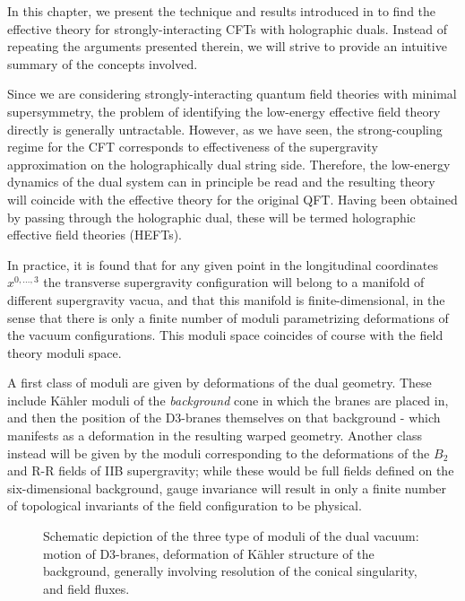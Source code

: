 In this chapter, we present the technique and results introduced in \cite{MZ} to find the effective theory for strongly-interacting CFTs with holographic duals. Instead of repeating the arguments presented therein, we will strive to provide an intuitive summary of the concepts involved.

Since we are considering strongly-interacting quantum field theories with minimal supersymmetry, the problem of identifying the low-energy effective field theory directly is generally untractable. However, as we have seen, the strong-coupling regime for the CFT corresponds to effectiveness of the supergravity approximation on the holographically dual string side. Therefore, the low-energy dynamics of the dual system can in principle be read and the resulting theory will coincide with the effective theory for the original QFT. Having been obtained by passing through the holographic dual, these will be termed holographic effective field theories (HEFTs).

In practice, it is found that for any given point in the longitudinal coordinates $x^{0,\ldots,3}$ the transverse supergravity configuration will belong to a manifold of different supergravity vacua, and that this manifold is finite-dimensional, in the sense that there is only a finite number of moduli parametrizing deformations of the vacuum configurations. This moduli space coincides of course with the field theory moduli space.

A first class of moduli are given by deformations of the dual geometry. These include K\"ahler moduli of the \emph{background} cone in which the branes are placed in, and then the position of the D3-branes themselves on that background - which manifests as a deformation in the resulting warped geometry. Another class instead will be given by the moduli corresponding to the deformations of the $B_2$ and R-R fields of IIB supergravity; while these would be full fields defined on the six-dimensional background, gauge invariance will result in only a finite number of topological invariants of the field configuration to be physical.\\


\begin{figure}
\centering
\def\svgwidth{200pt}
\captionsetup{width=0.8\textwidth}

\caption{Schematic depiction of the three type of moduli of the dual vacuum: motion of D3-branes, deformation of K\"ahler structure of the background, generally involving resolution of the conical singularity, and field fluxes.}
\end{figure}



